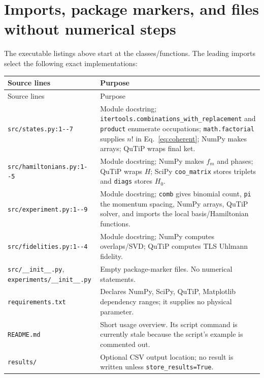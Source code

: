 \documentclass[11pt,a4paper]{article}
\newcommand{\code}[1]{\nolinkurl{#1}}
\begin{document}
\section{Imports, package markers, and files without numerical steps}
The executable listings above start at the classes/functions. The leading
imports select the following exact implementations:
\begin{center}\small
\begin{longtable}{p{}p{}}
\toprule Source lines & Purpose\\\midrule\endfirsthead
\toprule Source lines & Purpose\\\midrule\endhead
\code{src/states.py:1--7} & Module docstring; \code{itertools.combinations_with_replacement} and \code{product} enumerate occupations; \code{math.factorial} supplies $n!$ in Eq.~\eqref{eq:coherent}; NumPy makes arrays; QuTiP wraps final ket.\\
\code{src/hamiltonians.py:1--5} & Module docstring; NumPy makes $f_m$ and phases; QuTiP wraps $H$; SciPy \code{coo_matrix} stores triplets and \code{diags} stores $H_0$.\\
\code{src/experiment.py:1--9} & Module docstring; \code{comb} gives binomial count, \code{pi} the momentum spacing, NumPy arrays, QuTiP solver, and imports the local basis/Hamiltonian functions.\\
\code{src/fidelities.py:1--4} & Module docstring; NumPy computes overlaps/SVD; QuTiP computes TLS Uhlmann fidelity.\\
\code{src/__init__.py}, \code{experiments/__init__.py} & Empty package-marker files. No numerical statements.\\
\code{requirements.txt} & Declares NumPy, SciPy, QuTiP, Matplotlib dependency ranges; it supplies no physical parameter.\\
\code{README.md} & Short usage overview. Its script command is currently stale because the script's example is commented out.\\
\code{results/} & Optional CSV output location; no result is written unless \code{store_results=True}.\\
\bottomrule
\end{longtable}
\end{center}
\end{document}
